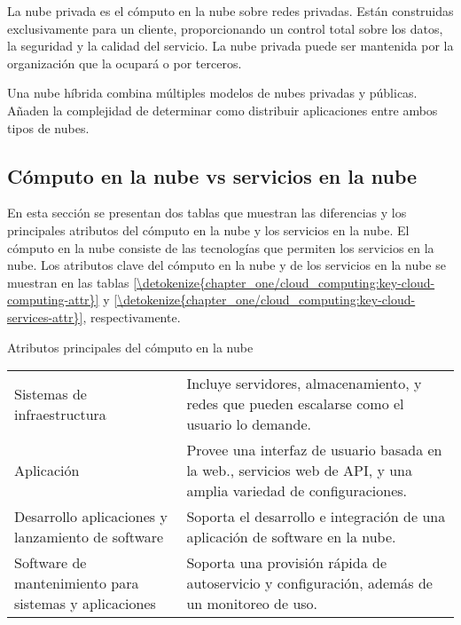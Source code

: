 La nube privada es el cómputo en la nube sobre redes privadas. Están construidas
exclusivamente para un cliente, proporcionando un control total sobre los datos,
la seguridad y la calidad del servicio. La nube privada puede ser mantenida por
la organización que la ocupará o por terceros.

Una nube híbrida combina múltiples modelos de nubes privadas y públicas. Añaden
la complejidad de determinar como distribuir aplicaciones entre ambos tipos de nubes.


\subsection{Cómputo en la nube vs servicios en la nube}
\label{\detokenize{chapter_one/cloud_computing:computo-en-la-nube-vs-servicios-en-la-nube}}
En esta sección se presentan dos tablas que muestran las diferencias y los principales
atributos del cómputo en la nube y los servicios en la nube. El cómputo en la nube
consiste de las tecnologías que permiten los servicios en la nube. Los atributos
clave del cómputo en la nube y de los servicios en la nube se muestran en las
tablas  \ref{\detokenize{chapter_one/cloud_computing:key-cloud-computing-attr}} y  \ref{\detokenize{chapter_one/cloud_computing:key-cloud-services-attr}}, respectivamente.


\begin{savenotes}\sphinxattablestart
\centering
{}
\caption{Atributos principales del cómputo en la nube \label{\detokenize{chapter_one/cloud_computing:key-cloud-computing-attr}}}
\sphinxaftercaption
\begin{tabulary}{\linewidth}[t]{|T|T|}
\hline
{}\relax &\relax \\
\hline
Sistemas de infraestructura
&
Incluye servidores, almacenamiento, y redes que pueden escalarse como el usuario lo demande.
\\
\hline
Aplicación
&
Provee una interfaz de usuario basada en la web., servicios web de API, y una amplia variedad de configuraciones.
\\
\hline
Desarrollo aplicaciones y lanzamiento de software
&
Soporta el desarrollo e integración de una aplicación de software en la nube.
\\
\hline
Software de mantenimiento para sistemas y aplicaciones
&
Soporta una provisión rápida de autoservicio y configuración, además de un monitoreo de uso.
\\
\hline
\end{tabulary}
\par
\sphinxattableend\end{savenotes}


